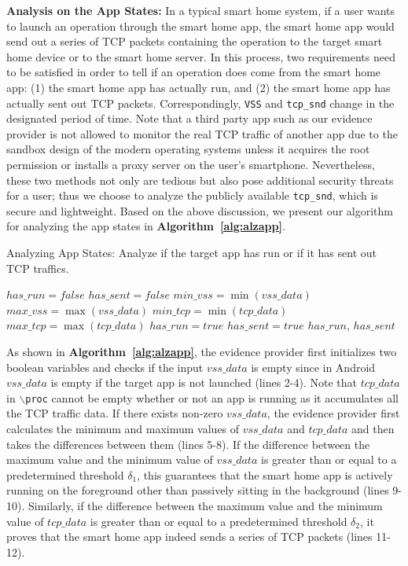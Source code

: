 \documentclass[letterpaper,12pt]{article}
\begin{document}
\textbf{Analysis on the App States:} 
In a typical smart home system, if a user wants to launch an operation through the smart home app, the smart home app would send out a series of TCP packets containing the operation to the target smart home device or to the smart home server. In this process, two requirements need to be satisfied in order to tell if an operation does come from the smart home app: (1) the smart home app has actually run, and (2) the smart home app has actually sent out TCP packets. Correspondingly, \texttt{VSS} and \texttt{tcp\_snd} change in the designated period of time. Note that a third party app such as our evidence provider is not allowed to monitor the real TCP traffic of another app due to the sandbox design of the modern operating systems unless it acquires the root permission or installs a proxy server on the user's smartphone. Nevertheless, these two methods not only are tedious but also pose additional security threats for a user; thus we choose to analyze the publicly available \texttt{tcp\_snd}, which is secure and lightweight.
Based on the above discussion, we present our algorithm for analyzing the app states in {\bf Algorithm~\ref{alg:alzapp}}.

\begin{algorithm}[!htb]
\caption{Analyzing App States: Analyze if the target app has run or if it has sent out TCP traffics.}\label{alg:alzapp}
\begin{algorithmic}[1]
\State $has\_run = false$
\State $has\_sent = false$
\State $min\_vss = \min(vss\_data)$
\State $max\_vss = \max(vss\_data)$
\State $min\_tcp = \min(tcp\_data)$
\State $max\_tcp = \max(tcp\_data)$
\State $has\_run = true$
\EndIf
{}
\State $has\_sent = true$
\EndIf
\EndIf
\Return $has\_run$, $has\_sent$
\EndProcedure
\end{algorithmic}
\end{algorithm}

As shown in {\bf Algorithm~\ref{alg:alzapp}}, the evidence provider first initializes two boolean variables and checks if the input $vss\_data$ is empty since in Android $vss\_data$ is empty if the target app is not launched (lines 2-4). Note that $tcp\_data$ in $\backslash$\texttt{proc} cannot be empty whether or not an app is running as it accumulates all the TCP traffic data. If there exists non-zero $vss\_data$, the evidence provider first calculates the minimum and maximum values of $vss\_data$ and $tcp\_data$ and then takes the differences between them (lines 5-8). If the difference between the maximum value and the minimum value of $vss\_data$ is greater than or equal to a predetermined threshold $\delta_1$, this guarantees that the smart home app is actively running on the foreground other than passively sitting in the background (lines 9-10). Similarly, if the difference between the maximum value and the minimum value of $tcp\_data$ is greater than or equal to a predetermined threshold $\delta_2$, it proves that the smart home app indeed sends a series of TCP packets (lines 11-12).
\end{document}
